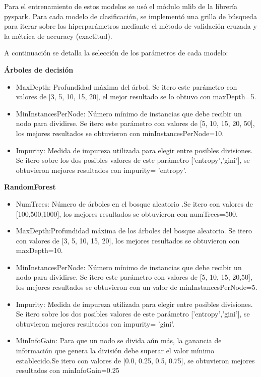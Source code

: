 Para el entrenamiento de estos modelos se usó el módulo mlib de la librería pyspark. Para cada modelo de clasificación, se implementó una grilla  de búsqueda para iterar sobre los  hiperparámetros  mediante el método de validación cruzada y la métrica de accuracy (exactitud).

A continuación se detalla la selección de los  parámetros de cada modelo:

\textbf{Árboles de decisión}

\begin{itemize}
	\item MaxDepth: Profundidad máxima del árbol. Se itero este parámetro con valores de  [3, 5, 10, 15, 20], el mejor resultado se lo obtuvo con maxDepth=5.
	\item MinInstancesPerNode: Número mínimo de instancias que debe  recibir un nodo para dividirse. Se itero este parámetro con valores de  [5, 10, 15, 20, 50], los mejores resultados se obtuvieron con minInstancesPerNode=10. 
	\item Impurity: Medida de impureza utilizada para elegir entre posibles divisiones. Se itero sobre los dos posibles valores de este parámetro ['entropy','gini'], se obtuvieron mejores resultados con impurity= 'entropy'.
\end{itemize}

\textbf{RandomForest}

\begin{itemize}
	\item NumTrees: Número de árboles en el bosque aleatorio .Se itero con valores de [100,500,1000], los mejores resultados se obtuvieron con numTrees=500.
	\item MaxDepth:Profundidad máxima de los árboles del bosque aleatorio. Se itero con valores de  [3, 5, 10, 15, 20], los mejores resultados se obtuvieron con maxDepth=10.
	\item MinInstancesPerNode: Número mínimo de instancias que debe  recibir un nodo para dividirse. Se itero este parámetro con valores de  [5, 10, 15, 20,50], los mejores resultados se obtuvieron con un valor de minInstancesPerNode=5. 
	\item Impurity: Medida de impureza utilizada para elegir entre posibles divisiones. Se itero sobre los dos posibles valores de este parámetro ['entropy','gini'], se obtuvieron mejores resultados con impurity= 'gini'.
	\item MinInfoGain: Para que un nodo se divida aún más, la ganancia de información que genera la división debe superar el valor mínimo establecido.Se itero con valores de   [0.0, 0.25, 0.5, 0.75],  se obtuvieron mejores resultados con minInfoGain=0.25
\end{itemize}

